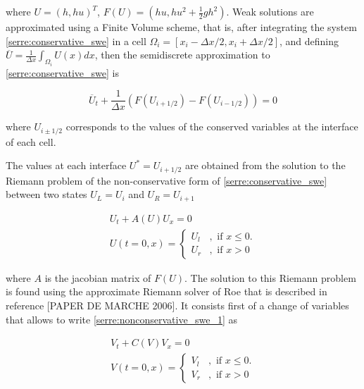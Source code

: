 \noindent where $U=(h,hu)^T$, $F(U) = (hu, hu^2 + \frac{1}{2}gh^2)$. Weak solutions are approximated using a Finite Volume scheme, that is, after integrating the system \eqref{serre:conservative_swe} in a cell $\Omega_i = [x_i-\Delta x/2, x_i+\Delta x/2]$, and defining $ \overline U = \frac{1}{\Delta x} \int_{\Omega_i} U(x)dx$, then the semidiscrete approximation to \eqref{serre:conservative_swe} is 

\begin{equation}
	\overline U _t + \frac{1}{\Delta x}\left( F(U_{i+1/2}) - F(U_{i-1/2}) \right) = 0
\end{equation}

\noindent where $U_{i\pm1/2}$ corresponds to the values of the conserved variables at the interface of each cell. 

The values at each interface $U^* = U_{i+1/2}$ are obtained from the solution to the Riemann problem of the non-conservative form of \eqref{serre:conservative_swe} between two states $U_L = U_i$ and $U_R = U_{i+1}$

\begin{equation}
	\begin{split}
	  U_t + A(U) U_x = 0 \\
	  U(t=0,x) = \begin{cases}
		 U_l &, \text{ if } x\leq 0. \\
		 U_r &, \text{ if } x > 0 
		\end{cases}
	\end{split}
	\label{serre:nonconservative_swe_1}
\end{equation}

\noindent where $A$ is the jacobian matrix of $F(U)$. The solution to this Riemann problem is found using the approximate Riemann solver of Roe that is described in reference [PAPER DE MARCHE 2006]. It consists first of a change of variables that allows to write \eqref{serre:nonconservative_swe_1} as

\begin{equation}
	\begin{split}
	  V_t + C(V)V_x = 0 \\
	  V(t=0,x) = \begin{cases}
		V_l &, \text{ if } x\leq 0. \\
	 V_r &, \text{ if } x > 0 
		\end{cases}
	\end{split}
	\label{serre:nonconservative_swe_2}
\end{equation}

